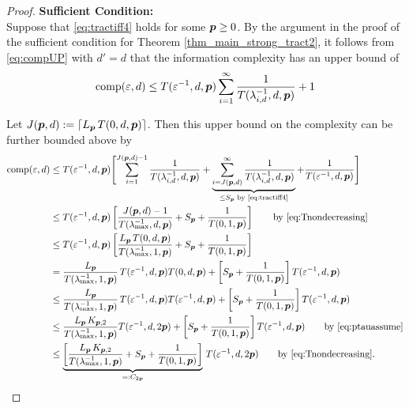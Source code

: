 \documentclass[11pt,a4paper]{article}
\begin{document}
\begin{proof}
    \textbf{Sufficient Condition:}\\
Suppose that \eqref{eq:tractiff4} holds for some $\boldsymbol{p} \ge 0$. By the argument in the proof of the sufficient condition for Theorem \ref{thm_main_strong_tract2}, it follows from \eqref{eq:compUP} with $d'=d$ that the information complexity has an upper bound of
\begin{equation*}
	 \operatorname{comp}(\varepsilon,d) \le  T(\varepsilon^{-1},d,\boldsymbol{p}) \sum_{i=1}^\infty \frac{1}{T(\lambda_{i, d}^{-1},d,\boldsymbol{p})} + 1
\end{equation*}

Let $J(\boldsymbol{p},d): = \lceil L_{\boldsymbol{p}}\, T(0,d,\boldsymbol{p})\rceil$.  Then this upper bound on the complexity can be further bounded above by
\begin{align*}
       \operatorname{comp}(\varepsilon,d)
       & \le T(\varepsilon^{-1},d,\boldsymbol{p}) \Biggl [ \sum_{i=1}^{J(\boldsymbol{p},d) -1} \frac{1}{T(\lambda_{i, d}^{-1},d,\boldsymbol{p})}
       + \underbrace{\sum_{i=J(\boldsymbol{p},d)}^\infty \frac{1}{T(\lambda_{i, d}^{-1},d,\boldsymbol{p})}}_{\le S_{\boldsymbol{p}} \text{ by \eqref{eq:tractiff4}}}
       + \frac{1}{T(\varepsilon^{-1},d, \boldsymbol{p})} \Biggr ] \\
       & \le T(\varepsilon^{-1},d,\boldsymbol{p})\left[ \frac{J(\boldsymbol{p},d)-1}{T(\lambda_{\max}^{-1},d,\boldsymbol{p})} + S_{\boldsymbol{p}} + \frac{1}{T(0,1, \boldsymbol{p})}\right]
       \qquad \text{by \eqref{eq:Tnondecreasing}}  \\
       & \le T(\varepsilon^{-1},d,\boldsymbol{p})\left[\frac{L_{\boldsymbol{p}}\, T(0,d,\boldsymbol{p})}{T(\lambda_{\max}^{-1},1,\boldsymbol{p})} + S_{\boldsymbol{p}} + \frac{1}{T(0,1, \boldsymbol{p})}\right] \\
       & =\frac{L_{\boldsymbol{p}}}{T(\lambda_{\max}^{-1},1,\boldsymbol{p})} \,T(\varepsilon^{-1},d,\boldsymbol{p}) T(0,d,\boldsymbol{p}) + \left [  S_{\boldsymbol{p}} + \frac{1}{T(0,1, \boldsymbol{p})}\right] T(\varepsilon^{-1},d,\boldsymbol{p})\\
       & \le\frac{L_{\boldsymbol{p}}}{T(\lambda_{\max}^{-1},1,\boldsymbol{p})} \,T(\varepsilon^{-1},d,\boldsymbol{p}) T(\varepsilon^{-1},d,\boldsymbol{p}) +\left [  S_{\boldsymbol{p}} + \frac{1}{T(0,1, \boldsymbol{p})}\right] T(\varepsilon^{-1},d,\boldsymbol{p})\\
       & \le \frac{L_{\boldsymbol{p}}\,K_{\boldsymbol{p},2}}{T(\lambda_{\max}^{-1},1,\boldsymbol{p})}  T(\varepsilon^{-1},d,2\boldsymbol{p})  +\left [  S_{\boldsymbol{p}} + \frac{1}{T(0,1, \boldsymbol{p})}\right] T(\varepsilon^{-1},d,\boldsymbol{p})  \qquad \text{by \eqref{eq:ptauassume}}\\
       & \le \underbrace{\left[\frac{L_{\boldsymbol{p}}\,K_{\boldsymbol{p},2}}{T(\lambda_{\max}^{-1},1,\boldsymbol{p})} + S_{\boldsymbol{p}} + \frac{1}{T(0,1, \boldsymbol{p})}\right]}_{=:C_{2\boldsymbol{p}}} \,T(\varepsilon^{-1},d,2\boldsymbol{p}) \qquad \text{by \eqref{eq:Tnondecreasing}}.
\end{align*}


\end{proof}
\end{document}
